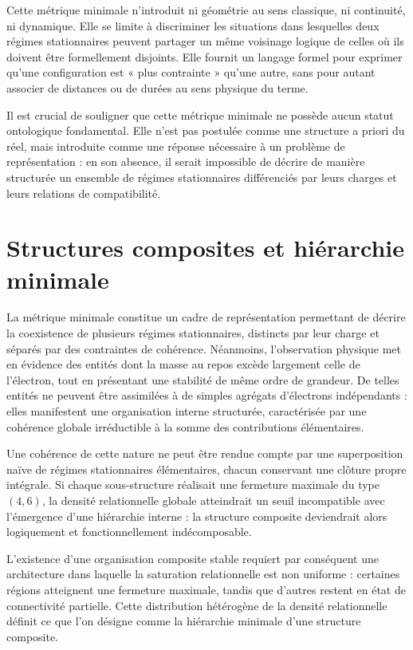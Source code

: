 \documentclass[11pt,a4paper]{article}
\begin{document}
Cette métrique minimale n’introduit ni géométrie au sens classique, ni continuité, ni dynamique. Elle se limite à discriminer les situations dans lesquelles deux régimes stationnaires peuvent partager un même voisinage logique de celles où ils doivent être formellement disjoints. Elle fournit un langage formel pour exprimer qu’une configuration est « plus contrainte » qu’une autre, sans pour autant associer de distances ou de durées au sens physique du terme.

Il est crucial de souligner que cette métrique minimale ne possède aucun statut ontologique fondamental. Elle n’est pas postulée comme une structure a priori du réel, mais introduite comme une réponse nécessaire à un problème de représentation : en son absence, il serait impossible de décrire de manière structurée un ensemble de régimes stationnaires différenciés par leurs charges et leurs relations de compatibilité.

\section{Structures composites et hiérarchie minimale}

La métrique minimale constitue un cadre de représentation permettant de décrire la coexistence de plusieurs régimes stationnaires, distincts par leur charge et séparés par des contraintes de cohérence. Néanmoins, l’observation physique met en évidence des entités dont la masse au repos excède largement celle de l’électron, tout en présentant une stabilité de même ordre de grandeur. De telles entités ne peuvent être assimilées à de simples agrégats d’électrons indépendants : elles manifestent une organisation interne structurée, caractérisée par une cohérence globale irréductible à la somme des contributions élémentaires.

Une cohérence de cette nature ne peut être rendue compte par une superposition naïve de régimes stationnaires élémentaires, chacun conservant une clôture propre intégrale. Si chaque sous-structure réalisait une fermeture maximale du type \(\left(4,6\right)\), la densité relationnelle globale atteindrait un seuil incompatible avec l’émergence d’une hiérarchie interne : la structure composite deviendrait alors logiquement et fonctionnellement indécomposable.

L’existence d’une organisation composite stable requiert par conséquent une architecture dans laquelle la saturation relationnelle est non uniforme : certaines régions atteignent une fermeture maximale, tandis que d’autres restent en état de connectivité partielle. Cette distribution hétérogène de la densité relationnelle définit ce que l’on désigne comme la hiérarchie minimale d’une structure composite.
\end{document}
